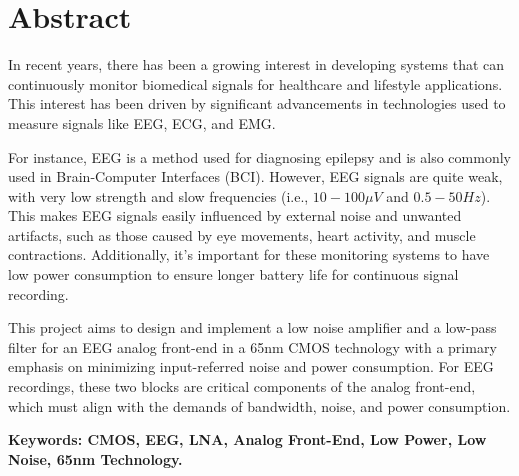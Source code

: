 \documentclass[../main.tex]{subfiles}
\begin{document}
\section{Abstract}

In recent years, there has been a growing interest in developing systems that can continuously
monitor biomedical signals for healthcare and lifestyle applications. This interest has been
driven by significant advancements in technologies used to measure signals like EEG, ECG,
and EMG. \vspace*{10pt}

For instance, EEG is a method used for diagnosing epilepsy and is also commonly used in
Brain-Computer Interfaces (BCI). However, EEG signals are quite weak, with very low strength
and slow frequencies (i.e., $10-100 \si{\mu V}$ and $0.5-50\si{Hz}$). This makes EEG signals easily influenced
by external noise and unwanted artifacts, such as those caused by eye movements, heart
activity, and muscle contractions. Additionally, it's important for these monitoring systems to
have low power consumption to ensure longer battery life for continuous signal recording. \vspace*{10pt}

This project aims to design and implement a low noise amplifier and a low-pass filter for an
EEG analog front-end in a 65nm CMOS technology with a primary emphasis on minimizing
input-referred noise and power consumption. For EEG recordings, these two blocks are critical
components of the analog front-end, which must align with the demands of bandwidth, noise,
and power consumption. \vspace*{10pt}

\noindent \textbf{Keywords: CMOS, EEG, LNA, Analog Front-End, Low Power, Low Noise, 65nm Technology.}
\end{document}
